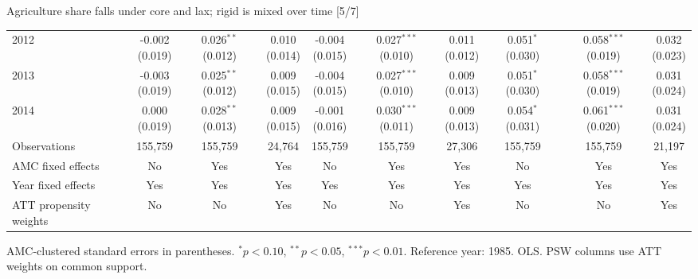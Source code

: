 \documentclass[aspectratio=169]{beamer}
\begin{document}
\begin{frame}{Agriculture share falls under core and lax; rigid is mixed over time [5/7]}
{\begin{tabular}{@{}l*{9}{c}@{}}
2012 & \shortstack{-0.002\\(0.019)} & \shortstack{0.026$^{**}$\\(0.012)} & \shortstack{0.010\\(0.014)} & \shortstack{-0.004\\(0.015)} & \shortstack{0.027$^{***}$\\(0.010)} & \shortstack{0.011\\(0.012)} & \shortstack{0.051$^{*}$\\(0.030)} & \shortstack{0.058$^{***}$\\(0.019)} & \shortstack{0.032\\(0.023)} \\
2013 & \shortstack{-0.003\\(0.019)} & \shortstack{0.025$^{**}$\\(0.012)} & \shortstack{0.009\\(0.015)} & \shortstack{-0.004\\(0.015)} & \shortstack{0.027$^{***}$\\(0.010)} & \shortstack{0.009\\(0.013)} & \shortstack{0.051$^{*}$\\(0.030)} & \shortstack{0.058$^{***}$\\(0.019)} & \shortstack{0.031\\(0.024)} \\
2014 & \shortstack{0.000\\(0.019)} & \shortstack{0.028$^{**}$\\(0.013)} & \shortstack{0.009\\(0.015)} & \shortstack{-0.001\\(0.016)} & \shortstack{0.030$^{***}$\\(0.011)} & \shortstack{0.009\\(0.013)} & \shortstack{0.054$^{*}$\\(0.031)} & \shortstack{0.061$^{***}$\\(0.020)} & \shortstack{0.031\\(0.024)} \\
\midrule
Observations & 155,759 & 155,759 & 24,764 & 155,759 & 155,759 & 27,306 & 155,759 & 155,759 & 21,197 \\
AMC fixed effects & No & Yes & Yes & No & Yes & Yes & No & Yes & Yes \\
Year fixed effects & Yes & Yes & Yes & Yes & Yes & Yes & Yes & Yes & Yes \\
ATT propensity weights & No & No & Yes & No & No & Yes & No & No & Yes \\
\bottomrule
\end{tabular}%
}
\vspace{0.1em}
{\tiny\color{ZMidGray} AMC-clustered standard errors in parentheses. $^{*}p<0.10$, $^{**}p<0.05$, $^{***}p<0.01$. Reference year: 1985. OLS. PSW columns use ATT weights on common support.}
\end{frame}
\end{document}
